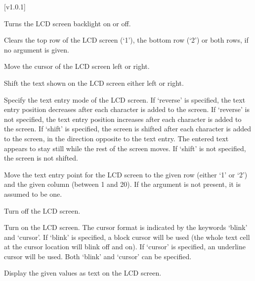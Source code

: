 [v1.0.1]




\pluginItemCommands[]

  \pluginListCmdBegin

  Turns the LCD screen backlight on or off.

  Clears the top row of the LCD screen (`1'), the bottom row (`2') or both rows, if no argument is given.

  Move the cursor of the LCD screen left or right.

  Shift the text shown on the LCD screen either left or right.

  Specify the text entry mode of the LCD screen.
  If `reverse' is specified, the text entry position decreases after each character is added to the screen.
  If `reverse' is not specified, the text entry position increases after each character is added to the screen.
  If `shift' is specified, the screen is shifted after each character is added to the screen,
  in the direction opposite to the text entry.
  The entered text appears to stay still while the rest of the screen moves.
  If `shift' is not specified, the screen is not shifted.

  Move the text entry point for the LCD screen to the given row (either `1' or `2') and the given column (between 1 and 20).
  If the argument  is not present, it is assumed to be one.

  Turn off the LCD screen.

  Turn on the LCD screen.
  The cursor format is indicated by the keywords `blink' and `cursor'.
  If `blink' is specified, a block cursor will be used (the whole text cell at the cursor location will blink off and on).
  If `cursor' is specified, an underline cursor will be used.
  Both `blink' and `cursor' can be specified.

  Display the given values as text on the LCD screen.

  \pluginListCmdEnd

\pluginItemComments


